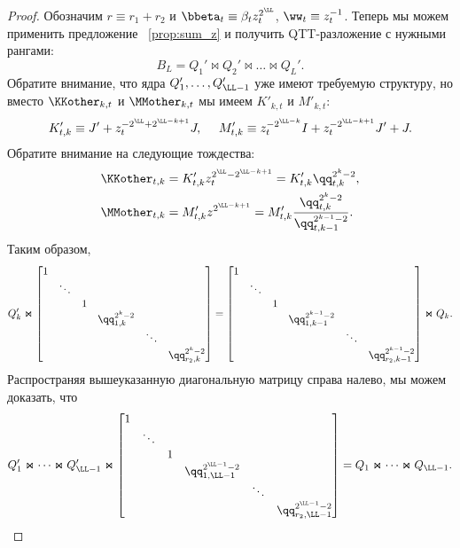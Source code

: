 \begin{proof}
	Обозначим $r \equiv r_1 + r_2$ и $\bbeta_t \equiv \beta_t z_t^{2^\LL}$, $\ww_t \equiv z_t^{-1}$.
	Теперь мы можем применить предложение ~\ref{prop:sum_z} и получить QTT-разложение с нужными рангами:
	\[
	B_L = Q_1' \Join Q_2' \Join \dots \Join Q_L'.
	\]
	Обратите внимание, что ядра $Q_1', \dots, Q_{\LL-1}'$ уже имеют требуемую структуру, но вместо $\KKother_{k,t}$ и $\MMother_{k, t}$ мы имеем $K'_{k,t}$ и $M'_{k,t}$:
	\[
	K'_{t,k} \equiv J' + z_t^{-2^\LL + 2^{\LL-k+1}}J,~~~~
	M'_{t,k} \equiv z_t^{-2^{\LL-k}} I + z_t^{-2^{\LL-k+1}} J'  + J.
	\]
	Обратите внимание на следующие тождества:
	\begin{align*}
	\KKother_{t,k} &= K'_{t,k}z_t^{2^\LL - 2^{\LL-k+1}} = K'_{t,k}\qq_{t,k}^{2^k-2}, \\
	\MMother_{t,k} &= M'_{t,k}z^{2^{\LL-k+1}} = M'_{t,k}\frac{\qq_{t,k}^{2^k-2}}{\qq_{t,k-1}^{2^{k-1}-2}}.
	\end{align*}
	Таким образом,
	\[
	Q'_{k}
	\Join
	\begin{bmatrix}
	1 &        &   &                         &        & \\
	& \ddots &   &                         &        & \\
	&        & 1 &                         &        & \\
	&        &   & \qq_{1,k}^{2^k-2}               &        & \\
	&        &   &                         & \ddots & \\
	&        &   &                         &        & \qq_{r_2,k}^{2^k-2} \\
	\end{bmatrix}
	=
	\begin{bmatrix}
	1 &        &   &                         &        & \\
	& \ddots &   &                         &        & \\
	&        & 1 &                         &        & \\
	&        &   & \qq_{1,k-1}^{2^{k-1}-2}             &        & \\
	&        &   &                         & \ddots & \\
	&        &   &                         &        & \qq_{r_2,k-1}^{2^{k-1}-2} \\
	\end{bmatrix}
	\Join
	Q_k.
	\]
	Распространяя вышеуказанную диагональную матрицу справа налево, мы можем доказать, что
	\[
	Q'_1\Join \dots \Join Q'_{\LL-1}
	\Join
	\begin{bmatrix}
	1 &        &   &                         &        & \\
	& \ddots &   &                         &        & \\
	&        & 1 &                         &        & \\
	&        &   & \qq_{1,\LL-1}^{2^{\LL-1}-2}             &        & \\
	&        &   &                         & \ddots & \\
	&        &   &                         &        & \qq_{r_2,\LL-1}^{2^{\LL-1}-2}
	\end{bmatrix}
	=
	Q_1\Join \dots \Join Q_{\LL-1}.
	\]
	

\end{proof}
